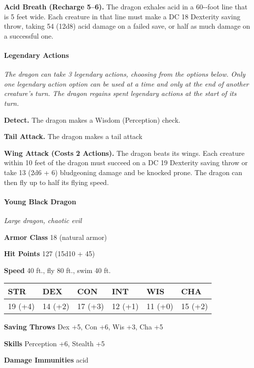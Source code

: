 \documentclass[
]{article}
\begin{document}
\textbf{Acid Breath (Recharge 5--6).} The dragon exhales acid in a
60-­‐foot line that is 5 feet wide. Each creature in that line must make
a DC 18 Dexterity saving throw, taking 54 (12d8) acid damage on a failed
save, or half as much damage on a successful one.

\hypertarget{legendary-actions-1}{%
\paragraph{Legendary Actions}\label{legendary-actions-1}}

\emph{The dragon can take 3 legendary actions, choosing from the options
below. Only one legendary action option can be used at a time and only
at the end of another creature's turn. The dragon regains spent
legendary actions at the start of its turn.}

\textbf{Detect.} The dragon makes a Wisdom (Perception) check.

\textbf{Tail Attack.} The dragon makes a tail attack

\textbf{Wing Attack (Costs 2 Actions).} The dragon beats its wings. Each
creature within 10 feet of the dragon must succeed on a DC 19 Dexterity
saving throw or take 13 (2d6 + 6) bludgeoning damage and be knocked
prone. The dragon can then fly up to half its flying speed.

\hypertarget{young-black-dragon}{%
\paragraph{Young Black Dragon}\label{young-black-dragon}}

\emph{Large dragon, chaotic evil}

\textbf{Armor Class} 18 (natural armor)

\textbf{Hit Points} 127 (15d10 + 45)

\textbf{Speed} 40 ft., fly 80 ft., swim 40 ft.

\begin{longtable}[]{@{}llllll@{}}
\toprule
STR & DEX & CON & INT & WIS & CHA\tabularnewline
\midrule
\endhead
19 (+4) & 14 (+2) & 17 (+3) & 12 (+1) & 11 (+0) & 15 (+2)\tabularnewline
\bottomrule
\end{longtable}

\textbf{Saving Throws} Dex +5, Con +6, Wis +3, Cha +5

\textbf{Skills} Perception +6, Stealth +5

\textbf{Damage Immunities} acid
\end{document}
